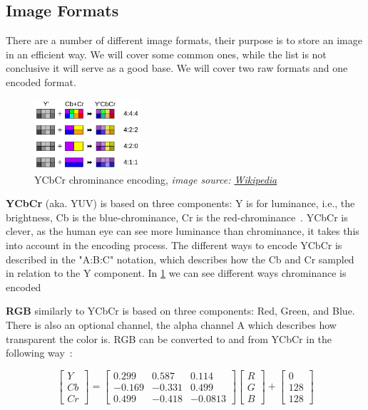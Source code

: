 \subsection{Image Formats} \label{section:imageformats}
There are a number of different image formats, their purpose is to store an
image in an efficient way. We will cover some common ones, while the list is
not conclusive it will serve as a good base. We will cover two raw formats and
one encoded format.

\begin{figure}
  \centering
  \includegraphics[width=0.35\textwidth]{figures/ycbcr.png}
  \caption{YCbCr chrominance encoding, \textit{image source: \href{https://en.wikipedia.org/wiki/Chroma_subsampling}{Wikipedia}}}
  \label{fig:ycbcr}
\end{figure}
\textbf{YCbCr} (aka. YUV) is based on three components: Y is for luminance, i.e., the
brightness, Cb is the blue-chrominance, Cr is the
red-chrominance~\cite{safir2022rgb}. YCbCr is clever, as the human eye can see
more luminance than chrominance, it takes this into account in the
encoding process. The different ways to encode YCbCr is described in the
"A:B:C" notation, which describes how the Cb and Cr sampled in relation to the
Y component. In \cref{fig:ycbcr} we can see different ways chrominance is
encoded

\pagebreak
\textbf{RGB} similarly to YCbCr is based on three components: Red, Green, and
Blue. There is also an optional channel, the alpha channel A which describes
how transparent the color is. RGB can be converted to and from YCbCr in the
following way~\cite{yang2007ycbcr}:

\[
\begin{bmatrix}
Y \\
Cb \\
Cr
\end{bmatrix}
=
\begin{bmatrix}
0.299 & 0.587 & 0.114 \\
-0.169 & -0.331 & 0.499 \\
0.499 & -0.418 & -0.0813
\end{bmatrix}
\begin{bmatrix}
R \\
G \\
B
\end{bmatrix}
+
\begin{bmatrix}
0 \\
128 \\
128
\end{bmatrix}
\]


